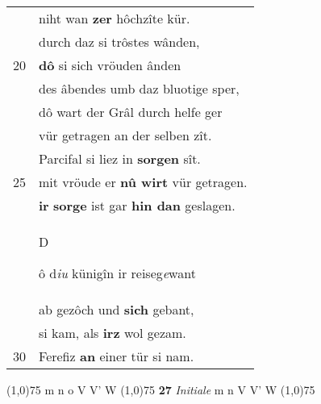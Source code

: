 \documentclass[8pt,a4paper,notitlepage]{article}
\begin{document}
\begin{table}[ht]
\begin{minipage}[t]{0.5\linewidth}
\begin{tabular}{rl}
 & niht wan \textbf{zer} hôchzîte kür.\\ 
 & durch daz si trôstes wânden,\\ 
20 & \textbf{dô} si sich vröuden ânden\\ 
 & des âbendes umb daz bluotige sper,\\ 
 & dô wart der Grâl durch helfe ger\\ 
 & vür getragen an der selben zît.\\ 
 & Parcifal si liez in \textbf{sorgen} sît.\\ 
25 & mit vröude er \textbf{nû wirt} vür getragen.\\ 
 & \textbf{ir} \textbf{sorge} ist gar \textbf{hin dan} geslagen.\\ 
 & \begin{large}D\end{large}ô d\textit{iu} künigîn ir reiseg\textit{e}want\\ 
 & ab gezôch und \textbf{sich} gebant,\\ 
 & si kam, als \textbf{irz} wol gezam.\\ 
30 & Ferefiz \textbf{an} einer tür si nam.\\ 
\end{tabular}
\scriptsize
\line(1,0){75} \newline
m n o V V' W \newline
\line(1,0){75} \newline
\textbf{27} \textit{Initiale} m n V V' W  \newline
\line(1,0){75} \newline

\end{minipage}
\end{table}
\end{document}
